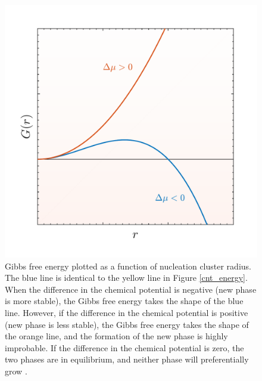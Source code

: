 \begin{figure}[h]
	\centering
	\includegraphics[width = .5\textwidth]{./Figures/CNT/cnt_mu.pdf}
	\caption[Gibbs free energy plotted as a function of nucleation cluster radius.  The blue line is identical to the yellow line in Figure \ref{cnt_energy}.  When the difference in the chemical potential is negative (new phase is more stable), the Gibbs free energy takes the shape of the blue line.  However, if the difference in the chemical potential is positive (new phase is less stable), the Gibbs free energy takes the shape of the orange line, and the formation of the new phase is highly improbable.  If the difference in the chemical potential is zero, the two phases are in equilibrium, and neither phase will preferentially grow.]{Gibbs free energy plotted as a function of nucleation cluster radius.  The blue line is identical to the yellow line in Figure \ref{cnt_energy}.  When the difference in the chemical potential is negative (new phase is more stable), the Gibbs free energy takes the shape of the blue line.  However, if the difference in the chemical potential is positive (new phase is less stable), the Gibbs free energy takes the shape of the orange line, and the formation of the new phase is highly improbable.  If the difference in the chemical potential is zero, the two phases are in equilibrium, and neither phase will preferentially grow \cite{Vehkamaki2006}. }
	\label{cnt_mu}
\end{figure}

